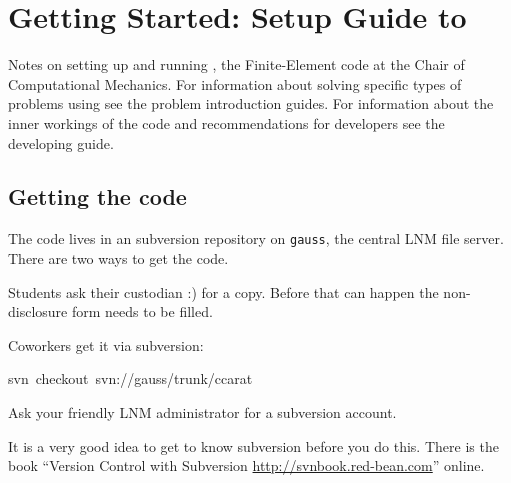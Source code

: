 
\makeatletter
\newenvironment{lyxcode}
{\begin{list}{}{
\setlength{\rightmargin}{\leftmargin}
\setlength{\listparindent}{0pt}%
\raggedright
\setlength{\itemsep}{0pt}
\setlength{\parsep}{0pt}
\normalfont\ttfamily}%
 \item[]}
{\end{list}}
\newenvironment{lyxlist}[1]
{\begin{list}{}
{\settowidth{\labelwidth}{#1}
 \setlength{\leftmargin}{\labelwidth}
 \addtolength{\leftmargin}{\labelsep}
 \renewcommand{\makelabel}[1]{##1\hfil}}}
{\end{list}}

\makeatother

\newcommand{\gauss}{{\tt gauss}}


\chapter{Getting Started: Setup Guide to \ccarat{}}


Notes on setting up and running \ccarat{}, the Finite-Element code
at the Chair of Computational Mechanics.
For information about solving specific types of problems using \ccarat{}
see the problem introduction guides. For information about the inner
workings of the code and recommendations for developers see the developing
guide.


\section{Getting the code}

The \ccarat{} code lives in an subversion repository on \gauss{},
the central LNM file server. There are two ways to get the code.

\begin{itemize}
\item Students ask their custodian :) for a copy. Before that can happen
the non-disclosure form needs to be filled.
\item Coworkers get it via subversion: 

\begin{lyxcode}
svn~checkout~svn://gauss/trunk/ccarat
\end{lyxcode}
Ask your friendly LNM administrator for a subversion account.

It is a very good idea to get to know subversion before you do this.
There is the book {}``Version Control with Subversion \url{http://svnbook.red-bean.com}''
online. 

\end{itemize}


